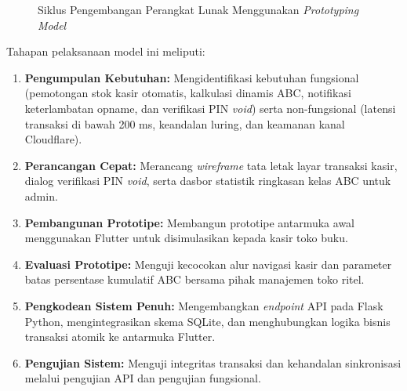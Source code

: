\documentclass[11pt, a4paper]{article}
\begin{document}
\begin{figure}[!htbp]
\centering
{}
\caption{Siklus Pengembangan Perangkat Lunak Menggunakan \textit{Prototyping Model}}
\label{fig:prototyping_model}
\end{figure}

Tahapan pelaksanaan model ini meliputi:
\begin{enumerate}[label=\alph*.]
    \item \textbf{Pengumpulan Kebutuhan:} Mengidentifikasi kebutuhan fungsional (pemotongan stok kasir otomatis, kalkulasi dinamis ABC, notifikasi keterlambatan opname, dan verifikasi PIN \textit{void}) serta non-fungsional (latensi transaksi di bawah 200 ms, keandalan luring, dan keamanan kanal Cloudflare).
    \item \textbf{Perancangan Cepat:} Merancang \textit{wireframe} tata letak layar transaksi kasir, dialog verifikasi PIN \textit{void}, serta dasbor statistik ringkasan kelas ABC untuk admin.
    \item \textbf{Pembangunan Prototipe:} Membangun prototipe antarmuka awal menggunakan Flutter untuk disimulasikan kepada kasir toko buku.
    \item \textbf{Evaluasi Prototipe:} Menguji kecocokan alur navigasi kasir dan parameter batas persentase kumulatif ABC bersama pihak manajemen toko ritel.
    \item \textbf{Pengkodean Sistem Penuh:} Mengembangkan \textit{endpoint} API pada Flask Python, mengintegrasikan skema SQLite, dan menghubungkan logika bisnis transaksi atomik ke antarmuka Flutter.
    \item \textbf{Pengujian Sistem:} Menguji integritas transaksi dan kehandalan sinkronisasi melalui pengujian API dan pengujian fungsional.
\end{enumerate}
\end{document}
